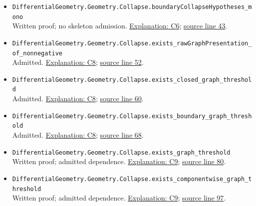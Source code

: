 \documentclass[
  letterpaper,
  11pt]{article}
\begin{document}
\begin{itemize}
{  line 35}.
\item
  {\small\texttt{Differential\allowbreak{}Geometry.\allowbreak{}Geometry.\allowbreak{}Collapse.\allowbreak{}boundary\allowbreak{}Collapse\allowbreak{}Hypotheses\_\allowbreak{}mono}}\\
  Written proof; no skeleton admission.
  \hyperref[collapse-hypotheses]{Explanation: C6};
  \href{https://github.com/qinz1yang/differential-geometry-dev/blob/ea0fae60ee01ef8c8d9b57a51794c6538f679c5d/DifferentialGeometry/Geometry/Collapse/GraphManifold.lean\#L43}{source
  line 43}.
\item
  {\small\texttt{Differential\allowbreak{}Geometry.\allowbreak{}Geometry.\allowbreak{}Collapse.\allowbreak{}exists\_\allowbreak{}raw\allowbreak{}Graph\allowbreak{}Presentation\_\allowbreak{}of\_\allowbreak{}nonnegative}}\\
  Admitted. \hyperref[collapse-admitted]{Explanation: C8};
  \href{https://github.com/qinz1yang/differential-geometry-dev/blob/ea0fae60ee01ef8c8d9b57a51794c6538f679c5d/DifferentialGeometry/Geometry/Collapse/GraphManifold.lean\#L52}{source
  line 52}.
\item
  {\small\texttt{Differential\allowbreak{}Geometry.\allowbreak{}Geometry.\allowbreak{}Collapse.\allowbreak{}exists\_\allowbreak{}closed\_\allowbreak{}graph\_\allowbreak{}threshold}}\\
  Admitted. \hyperref[collapse-admitted]{Explanation: C8};
  \href{https://github.com/qinz1yang/differential-geometry-dev/blob/ea0fae60ee01ef8c8d9b57a51794c6538f679c5d/DifferentialGeometry/Geometry/Collapse/GraphManifold.lean\#L60}{source
  line 60}.
\item
  {\small\texttt{Differential\allowbreak{}Geometry.\allowbreak{}Geometry.\allowbreak{}Collapse.\allowbreak{}exists\_\allowbreak{}boundary\_\allowbreak{}graph\_\allowbreak{}threshold}}\\
  Admitted. \hyperref[collapse-admitted]{Explanation: C8};
  \href{https://github.com/qinz1yang/differential-geometry-dev/blob/ea0fae60ee01ef8c8d9b57a51794c6538f679c5d/DifferentialGeometry/Geometry/Collapse/GraphManifold.lean\#L68}{source
  line 68}.
\item
  {\small\texttt{Differential\allowbreak{}Geometry.\allowbreak{}Geometry.\allowbreak{}Collapse.\allowbreak{}exists\_\allowbreak{}graph\_\allowbreak{}threshold}}\\
  Written proof; admitted dependence.
  \hyperref[collapse-composition]{Explanation: C9};
  \href{https://github.com/qinz1yang/differential-geometry-dev/blob/ea0fae60ee01ef8c8d9b57a51794c6538f679c5d/DifferentialGeometry/Geometry/Collapse/GraphManifold.lean\#L80}{source
  line 80}.
\item
  {\small\texttt{Differential\allowbreak{}Geometry.\allowbreak{}Geometry.\allowbreak{}Collapse.\allowbreak{}exists\_\allowbreak{}componentwise\_\allowbreak{}graph\_\allowbreak{}threshold}}\\
  Written proof; admitted dependence.
  \hyperref[collapse-composition]{Explanation: C9};
  \href{https://github.com/qinz1yang/differential-geometry-dev/blob/ea0fae60ee01ef8c8d9b57a51794c6538f679c5d/DifferentialGeometry/Geometry/Collapse/GraphManifold.lean\#L97}{source
  line 97}.
\end{itemize}
\end{document}
